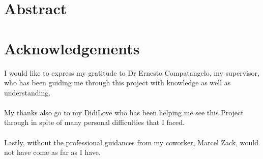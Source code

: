 \documentclass[main.tex]{subfiles}
\begin{document}
  \pagestyle{plain}
  
  \begingroup
    \fontsize{8pt}{10pt}\selectfont
    
    \section*{Abstract}
  
    \lipsum[1]
  
  \endgroup
  \hrulefill
  
  \section*{Acknowledgements}
    
    I would like to express my gratitude to Dr Ernesto Compatangelo, my supervisor, who has been guiding me through this project with knowledge as well as understanding.
    \\\\
    My thanks also go to my DidiLove who has been helping me see this Project through in spite of many personal difficulties that I faced.
    \\\\
    Lastly, without the professional guidances from my coworker, Marcel Zack,  would not have come as far as I have.
  
\end{document}
